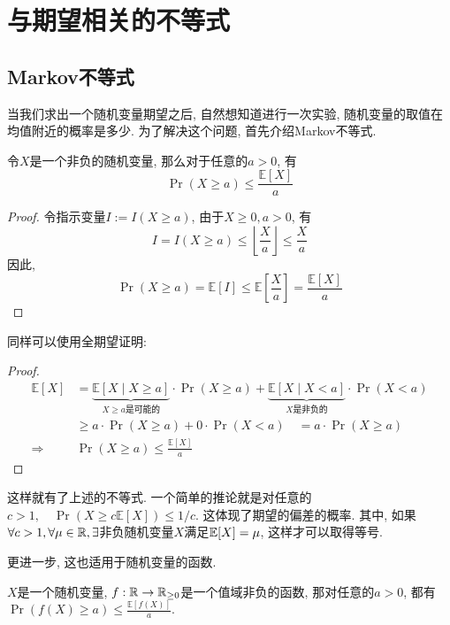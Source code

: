 \documentclass{ctexart}
\begin{document}
\section{与期望相关的不等式}

\subsection{Markov不等式}

当我们求出一个随机变量期望之后, 自然想知道进行一次实验, 随机变量的取值在均值附近的概率是多少. 为了解决这个问题, 首先介绍Markov不等式. 


\begin{theorem}[Markov不等式]
    令$X$是一个非负的随机变量, 那么对于任意的$a>0$, 有
$$
\operatorname{Pr}(X \geq a) \leq \frac{\mathbb{E}[X]}{a}
$$

\end{theorem}

\begin{proof}
    令指示变量$I:=I(X\geq a)$, 由于$X\geq 0, a>0$, 有
    $$
I=I(X \geq a) \leq\left\lfloor\frac{X}{a}\right\rfloor \leq \frac{X}{a}
$$
因此, 
$$
\operatorname{Pr}(X \geq a)=\mathbb{E}[I] \leq \mathbb{E}\left[\frac{X}{a}\right]=\frac{\mathbb{E}[X]}{a}
$$
\end{proof}


同样可以使用全期望证明: 
\begin{proof}
    $$
    \begin{aligned}\mathbb{E}[X] & =\underbrace{\mathbb{E}[X\mid X\geq a]}_{X\geq a\text{是可能的}}\cdot\operatorname{Pr}(X\geq a)+\underbrace{\mathbb{E}[X\mid X<a]}_{X\text{是非负的}}\cdot\operatorname{Pr}(X<a)\\
 & \geq a\cdot\operatorname{Pr}(X\geq a)+0\cdot\operatorname{Pr}(X<a)\quad=a\cdot\operatorname{Pr}(X\geq a)\\
\Longrightarrow & \operatorname{Pr}(X\geq a)\leq\frac{\mathbb{E}[X]}{a}
\end{aligned}
$$
\end{proof}

这样就有了上述的不等式. 一个简单的推论就是对任意的$c>1, \quad \operatorname{Pr}(X \geq c \mathbb{E}[X]) \leq 1 / c$. 这体现了期望的偏差的概率. 其中, 如果$\forall c>1, \forall \mu \in \mathbb R, \exists$非负随机变量$X$满足$\mathbb E[X]=\mu$, 这样才可以取得等号. 

更进一步, 这也适用于随机变量的函数. 

\begin{corollary}
    $X$是一个随机变量, $f:\mathbb R\to \mathbb R_{\geq 0}$是一个值域非负的函数, 那对任意的$a>0$, 都有$\operatorname{Pr}(f(X) \geq a) \leq \frac{\mathbb{E}[f(X)]}{a}$. 
\end{corollary}
\end{document}
